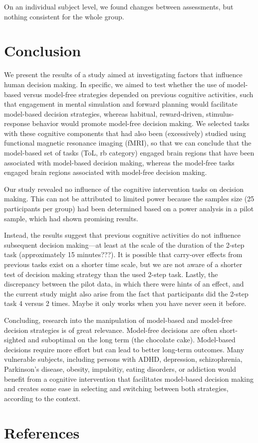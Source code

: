 \documentclass[11pt]{article} %
\begin{document}
On an individual subject level, we found changes between assessments, but nothing consistent for the whole group.

\section{Conclusion}
We present the results of a study aimed at investigating factors that influence human decision making. In specific, we aimed to test whether the use of model-based versus model-free strategies depended on previous cognitive activities, such that engagement in mental simulation and forward planning would facilitate model-based decision strategies, whereas habitual, reward-driven, stimulus-response behavior would promote model-free decision making. We selected tasks with these cognitive components that had also been (excessively) studied using functional magnetic resonance imaging (fMRI), so that we can conclude that the model-based set of tasks (ToL, rb category) engaged brain regions that have been associated with model-based decision making, whereas the model-free tasks engaged brain regions associated with model-free decision making. 

Our study revealed no influence of the cognitive intervention tasks on decision making. This can not be attributed to limited power because the samples size (25 participants per group) had been determined based on a power analysis in a pilot sample, which had shown promising results. 

Instead, the results suggest that previous cognitive activities do not influence subsequent decision making---at least at the scale of the duration of the 2-step task (approximately 15 minutes???). It is possible that carry-over effects from previous tasks exist on a shorter time scale, but we are not aware of a shorter test of decision making strategy than the used 2-step task. Lastly, the discrepancy between the pilot data, in which there were hints of an effect, and the current study might also arise from the fact that participants did the 2-step task 4 versus 2 times. Maybe it only works when you have never seen it before.

Concluding, research into the manipulation of model-based and model-free decision strategies is of great relevance. Model-free decisions are often short-sighted and suboptimal on the long term (the chocolate cake). Model-based decisions require more effort but can lead to better long-term outcomes. Many vulnerable subjects, including persons with ADHD, depression, schizophrenia, Parkinson's disease, obesity, impulsitiy, eating disorders, or addiction would benefit from a cognitive intervention that facilitates model-based decision making and creates some ease in selecting and switching between both strategies, according to the context.

\section{References}
\end{document}

